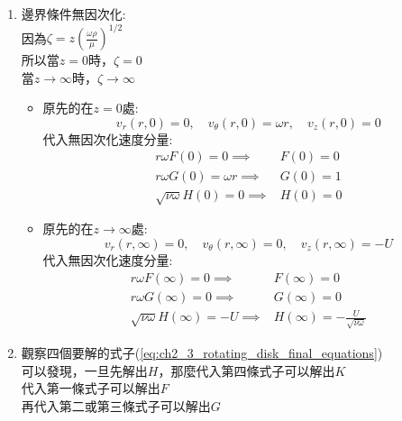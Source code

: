 \documentclass[../main.tex]{subfiles}
\begin{document}
\begin{itemize}
\begin{enumerate}
\begin{itemize}
\begin{equation}
\begin{cases}
          K - K(0) = H' - \frac{1}{2}H^2
        \end{cases} \label{eq:ch2_3_rotating_disk_final_equations}
      \end{equation}
    \end{itemize}
    \item 邊界條件無因次化:\\
      因為$\zeta = z \left(\frac{\omega \rho}{\mu}\right)^{1/2}$\\
      所以當$z=0$時，$\zeta = 0$\\
      當$z\to\infty$時，$\zeta \to \infty$
      \begin{itemize}
        \item 原先的在$z=0$處:
        \begin{equation}
          v_r(r,0) = 0, \quad v_\theta(r,0) = \omega r, \quad v_z(r,0) = 0
        \end{equation}
        代入無因次化速度分量:
        \begin{align}
          r \omega F(0) = 0 \implies & \boxed{F(0) = 0} \nonumber\\
          r \omega G(0) = \omega r \implies & \boxed{G(0) = 1} \nonumber\\
          \sqrt{\nu \omega} H(0) = 0 \implies & \boxed{H(0) = 0}
        \end{align}
        \item 原先的在$z\to\infty$處:
        \begin{equation}
          v_r(r,\infty) = 0, \quad v_\theta(r,\infty) = 0, \quad v_z(r,\infty) = -U
        \end{equation}
        代入無因次化速度分量:
        \begin{align}
          r \omega F(\infty) = 0 \implies & \boxed{F(\infty) = 0} \nonumber\\
          r \omega G(\infty) = 0 \implies & \boxed{G(\infty) = 0} \nonumber\\
          \sqrt{\nu \omega} H(\infty) = -U \implies & \boxed{H(\infty) = -\frac{U}{\sqrt{\nu \omega}}}
        \end{align}
      \end{itemize}
    \item 觀察四個要解的式子(\ref{eq:ch2_3_rotating_disk_final_equations})\\
    可以發現，一旦先解出$H$，那麼代入第四條式子可以解出$K$\\
    代入第一條式子可以解出$F$\\
    再代入第二或第三條式子可以解出$G$\\

\end{enumerate}
\end{itemize}
\end{document}
